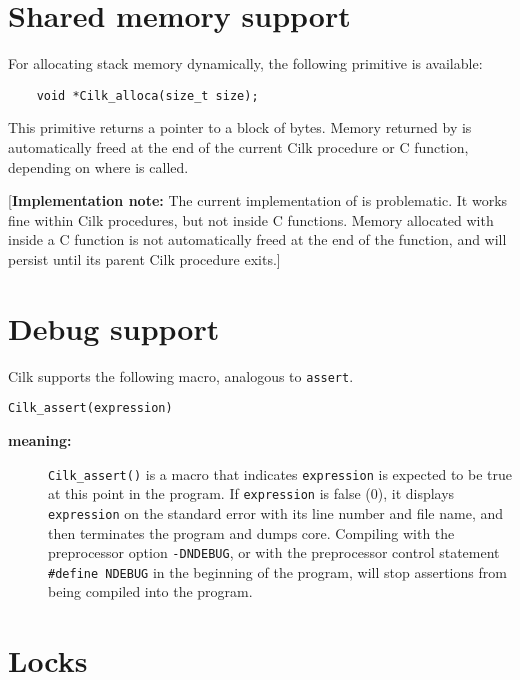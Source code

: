 \section{Shared memory support}
\label{sec:lib-alloca}
For allocating stack memory dynamically, the following primitive is
available:
\begin{verbatim}
    void *Cilk_alloca(size_t size);
\end{verbatim}
This primitive returns a pointer to a block of  bytes.
Memory returned by  is automatically freed at the
end of the current Cilk procedure or C function, depending on where
 is called.

[\textbf{Implementation note:} The current implementation of
 is problematic.  It works fine within Cilk
procedures, but not inside C functions.  Memory allocated with
 inside a C function is not automatically freed
at the end of the function, and will persist until its parent Cilk
procedure exits.]

\section{Debug support}
Cilk supports the following macro, analogous to \texttt{assert}.
\begin{verbatim}
Cilk_assert(expression)
\end{verbatim}
\begin{description}
\item[{\bf meaning:}] \texttt{Cilk\_assert()} is a macro that
indicates \texttt{expression} is expected to be true at this point in
the program.  If \texttt{expression} is false (0), it displays
\texttt{expression} on the standard error with its line number and
file name, and then terminates the program and dumps core.  Compiling
with the preprocessor option \texttt{-DNDEBUG}, or with the
preprocessor control statement \texttt{\#define NDEBUG} in the
beginning of the program, will stop assertions from being compiled
into the program.
\end{description}

\section{Locks}
\label{sec:lanref:locks}

